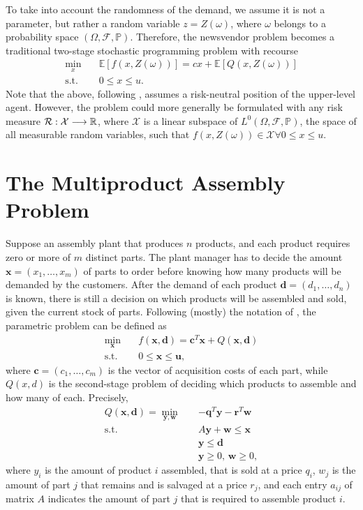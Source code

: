 \documentclass[12pt]{article}
\begin{document}
To take into account the randomness of the demand, we assume it is not a parameter, but rather a random variable $z=Z(\omega)$, where $\omega$ belongs to a probability space $(\Omega,\mathcal{F},\mathbb{P})$.
Therefore, the newsvendor problem becomes a traditional two-stage stochastic programming problem with recourse
\begin{align*}
    \min_{x} \quad & \mathbb{E}\left[ f(x,Z(\omega)) \right] = cx + \mathbb{E}\left[ Q(x,Z(\omega)) \right]  \\
    \textrm{s.t.} \quad & 0\le x\le u
.\end{align*}
Note that the above, following \citet{birgeIntroductionStochasticProgramming2011}, assumes a risk-neutral position of the upper-level agent.
However, the problem could more generally be formulated with any risk measure $\mathcal{R}: \mathcal{X} \longrightarrow \mathbb{R}$, where $\mathcal{X}$ is a linear subspace of $L^{0}(\Omega, \mathcal{F},\mathbb{P})$, the space of all measurable random variables, such that $f(x,Z(\omega)) \in \mathcal{X} \forall 0\le x\le u$.


\section*{The Multiproduct Assembly Problem}

Suppose an assembly plant that produces $n$ products, and each product requires zero or more of $m$ distinct parts.
The plant manager has to decide the amount $\bm{x}=(x_1,\ldots,x_{m})$ of parts to order before knowing how many products will be demanded by the customers.
After the demand of each product $\bm{d}=(d_1,\ldots,d_n)$ is known, there is still a decision on which products will be assembled and sold, given the current stock of parts.
Following (mostly) the notation of \citet{shapiroLecturesStochasticProgramming2009}, the parametric problem can be defined as
\begin{align*}
    \min_{\bm{x}} \quad & f(\bm{x},\bm{d}) = \bm{c}^{T} \bm{x} + Q(\bm{x}, \bm{d}) \\
    \textrm{s.t.} \quad & 0 \le \bm{x} \le \bm{u}
,\end{align*}
where $\bm{c}=(c_1,\ldots,c_m)$ is the vector of acquisition costs of each part, while $Q(x,d)$ is the second-stage problem of deciding which products to assemble and how many of each.
Precisely,
\begin{align*}
    Q(\bm{x},\bm{d}) = \min_{\bm{y},\bm{w}} \quad & -\bm{q}^{T} \bm{y} - \bm{r}^{T}\bm{w} \\
    \textrm{s.t.} \quad & A\bm{y} + \bm{w} \le \bm{x} \\
      & \bm{y} \le \bm{d} \\
      & \bm{y} \ge 0,\, \bm{w} \ge 0
,\end{align*}
where $y_i$ is the amount of product $i$ assembled, that is sold at a price $q_i$, $w_j$ is the amount of part $j$ that remains and is salvaged at a price $r_j$, and each entry $a_{ij}$ of matrix $A$ indicates the amount of part $j$ that is required to assemble product $i$.
\end{document}
